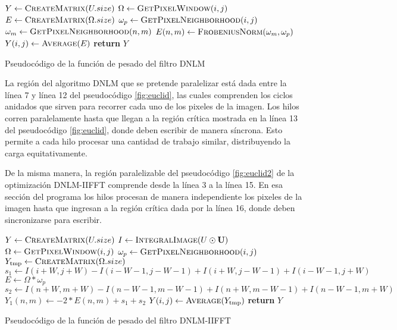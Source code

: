 \begin{algorithm}
\begin{algorithmic}[1]
\State $Y\gets \Call{CreateMatrix}{U.size}$
		\State $\Omega\gets \Call{GetPixelWindow}{i,j}$
        \State $E\gets \Call{CreateMatrix}{\Omega.size}$
        \State $\omega_{p}\gets \Call{GetPixelNeighborhood}{i,j}$
        		\State $\omega_{m}\gets \Call{GetPixelNeighborhood}{n,m}$
                \State $E(n,m)\gets \Call{FrobeniusNorm}{\omega_m,\omega_p}$              
        	\EndFor 
        \EndFor 
        \State $Y(i,j)\gets \Call{Average}{E}$
	\EndFor
\EndFor
\State \textbf{return} $Y$
\end{algorithmic}
\caption{Pseudocódigo de la funci\'on de pesado del filtro DNLM\label{fig:euclid}}
\end{algorithm}

La región del algoritmo DNLM que se pretende paralelizar está dada entre la l\'inea 7 y línea 12 del pseudoc\'odigo \ref{fig:euclid}, las cuales comprenden los ciclos anidados que sirven para recorrer cada uno de los pixeles de la imagen. Los hilos corren paralelamente hasta que llegan a la región crítica mostrada en la línea 13 del pseudoc\'odigo \ref{fig:euclid}, donde deben escribir de manera síncrona. Esto permite a cada hilo procesar una cantidad de trabajo similar, distribuyendo la carga equitativamente.

De la misma manera, la regi\'on paralelizable del pseudoc\'odigo \ref{fig:euclid2} de la optimización DNLM-IIFFT comprende desde la línea 3 a la línea 15. En esa secci\'on del programa los hilos procesan de manera independiente los pixeles de la imagen hasta que ingresan a la región crítica dada por la línea 16, donde deben sincronizarse para escribir.


\begin{algorithm}
\begin{algorithmic}[1]
\State $Y\gets \Call{CreateMatrix}{U.size}$
\State $I\gets \Call{IntegralImage}{U\odot \mat{U}}$
		\State $\Omega\gets \Call{GetPixelWindow}{i,j}$
        \State $\omega_{p}\gets \Call{GetPixelNeighborhood}{i,j}$
        \State $Y_{\text{tmp}}\gets \Call{CreateMatrix}{\Omega.size}$
        \State $s_{1} \gets I(i+W,j+W)-I(i-W-1,j-W-1)+I(i+W,j-W-1)+I(i-W-1,j+W)$
        \State $E\gets \Omega * \omega_{p}$ 
        		\State $s_{2} \gets I(n+W,m+W)-I(n-W-1,m-W-1)+I(n+W,m-W-1)+I(n-W-1,m+W)$
        		\State $Y_{1}(n,m)\gets -2*E(n,m) + s_{1} + s_{2}$
        	\EndFor 
        \EndFor 
        \State $Y(i,j)\gets \Call{Average}{Y_{\text{tmp}}}$
	\EndFor
\EndFor
\State \textbf{return} $Y$
\end{algorithmic}
\caption{Pseudocódigo de la funci\'on de pesado del filtro DNLM-IIFFT\label{fig:euclid2}}
\end{algorithm}

